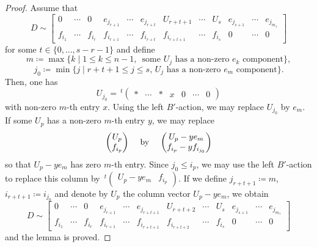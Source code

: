 \documentclass[pdftex]{sigma}
\numberwithin{equation}{section}
\theoremstyle{definition}
\theoremstyle{plain}
\theoremstyle{plain}
\theoremstyle{plain}
\theoremstyle{plain}
\begin{document}
\begin{proof}
	Assume that
	\begin{equation*}
		D \sim \begin{bmatrix}
		0 & \cdots & 0 & e_{j_{r+1}} & \cdots & e_{j_{r+t}} & U_{r+t+1} & \cdots & U_{s} & e_{j_{s+1}} & \cdots & e_{j_{m_1}} \\
		f_{i_1} & \cdots & f_{i_r} & f_{i_{r+1}} & \cdots & f_{i_{r+t}} & f_{i_{r+t+1}} & \cdots & f_{i_s} & 0 & \cdots & 0
	\end{bmatrix}
	\end{equation*}
	for some $t \in \{0,\dots,s-r-1\}$ and define
	\begin{equation*}
		m \coloneq \max \{k \mid 1 \leqslant k \leqslant n-1, \, \text{ some } U_j \text{ has a non-zero } e_k \text{ component}\},
	\end{equation*}
	\begin{equation*}
		j_0 \coloneq \min \{j \mid r+t+1 \leqslant j \leqslant s, \, U_{j} \text{ has a non-zero } e_m \text{ component}\}.
	\end{equation*}
	Then, one has
	\begin{equation*}
		U_{j_0} = \,^t \begin{pmatrix}
		\ast & \cdots & \ast & x & 0 & \cdots & 0
	\end{pmatrix}
	\end{equation*}
	with non-zero $m$-th entry $x$. Using the left $B'$-action, we may replace $U_{j_0}$ by $e_{m}$. If some $U_{p}$ has a non-zero $m$-th entry $y$, we may replace
	\begin{equation*}
		\begin{pmatrix}
		U_p \\
		f_{i_p}
	\end{pmatrix} \hspace{3mm} \text{ by } \hspace{3mm} 
		\begin{pmatrix}
		U_p-ye_m \\
		f_{i_p}-yf_{i_{j_0}}
	\end{pmatrix}
	\end{equation*}
	so that $U_p-ye_m$ has zero $m$-th entry. Since $j_0 \leqslant i_p$, we may use the left $B'$-action to replace this column by $\,^t \begin{pmatrix}
		U_p-ye_m & f_{i_p}
	\end{pmatrix}$.
	If we define $j_{r+t+1} \coloneq m$, $i_{r+t+1} \coloneq i_{j_0}$ and denote by $U_p$ the column vector $U_p-ye_m$, we obtain
	\begin{equation*}
		D \sim \begin{bmatrix}
		0 & \cdots & 0 & e_{j_{r+1}} & \cdots & e_{j_{r+t+1}} & U_{r+t+2} & \cdots & U_{s} & e_{j_{s+1}} & \cdots & e_{j_{m_1}} \\
		f_{i_1} & \cdots & f_{i_r} & f_{i_{r+1}} & \cdots & f_{i_{r+t+1}} & f_{i_{r+t+2}} & \cdots & f_{i_s} & 0 & \cdots & 0
	\end{bmatrix}
	\end{equation*}
	and the lemma is proved.
\end{proof}
\end{document}
